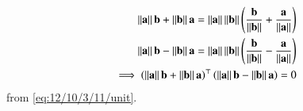 \begin{align}
\norm{\vec{a}}\vec{b}+\norm{\vec{b}}\vec{a}
=
	\norm{\vec{a}}\norm{\vec{b}}\brak{\frac{\vec{b}}{\norm{\vec{b}}}+\frac{\vec{a}}{\norm{\vec{a}}}}
	\\
\norm{\vec{a}}\vec{b}-\norm{\vec{b}}\vec{a}
=
	\norm{\vec{a}}\norm{\vec{b}}\brak{\frac{\vec{b}}{\norm{\vec{b}}}-\frac{\vec{a}}{\norm{\vec{a}}}}
	\\
	\implies 
	\brak{\norm{\vec{a}}\vec{b}+\norm{\vec{b}}\vec{a}}^{\top} \brak{\norm{\vec{a}}\vec{b}-\norm{\vec{b}}\vec{a}} = 0
\end{align}
	from \eqref{eq:12/10/3/11/unit}.
